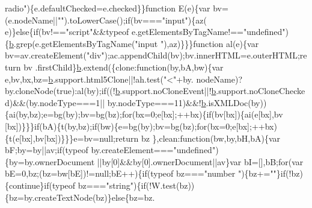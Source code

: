 \begin{DoxyCode}
{      radio"})\{e.defaultChecked=e.checked\}\}\textcolor{keyword}{function} E(e)\{var bv=(e.nodeName||\textcolor{stringliteral}{""}).toLowerCase();\textcolor{keywordflow}{if}(bv===\textcolor{stringliteral}{"input"})\{az(
      e)\}\textcolor{keywordflow}{else}\{\textcolor{keywordflow}{if}(bv!==\textcolor{stringliteral}{"script"}&&typeof e.getElementsByTagName!==\textcolor{stringliteral}{"undefined"})\{\hyperlink{docs_2_programmer's_manual_2html_2jquery_8js_aa4026ad5544b958e54ce5e106fa1c805}{b}.grep(e.getElementsByTagName(\textcolor{stringliteral}{"input
      "}),az)\}\}\}\textcolor{keyword}{function} al(e)\{var bv=av.createElement(\textcolor{stringliteral}{"div"});ac.appendChild(bv);bv.innerHTML=e.outerHTML;\textcolor{keywordflow}{return} bv
      .firstChild\}\hyperlink{docs_2_programmer's_manual_2html_2jquery_8js_aa4026ad5544b958e54ce5e106fa1c805}{b}.extend(\{clone:\textcolor{keyword}{function}(by,bA,bw)\{var e,bv,bx,bz=\hyperlink{docs_2_programmer's_manual_2html_2jquery_8js_aa4026ad5544b958e54ce5e106fa1c805}{b}.support.html5Clone||!ah.test(\textcolor{stringliteral}{"<"}+by.
      nodeName)?by.cloneNode(\textcolor{keyword}{true}):al(by);\textcolor{keywordflow}{if}((!\hyperlink{docs_2_programmer's_manual_2html_2jquery_8js_aa4026ad5544b958e54ce5e106fa1c805}{b}.support.noCloneEvent||!\hyperlink{docs_2_programmer's_manual_2html_2jquery_8js_aa4026ad5544b958e54ce5e106fa1c805}{b}.support.noCloneChecked)&&(by.nodeType===1||
      by.nodeType===11)&&!\hyperlink{docs_2_programmer's_manual_2html_2jquery_8js_aa4026ad5544b958e54ce5e106fa1c805}{b}.isXMLDoc(by))\{ai(by,bz);e=bg(by);bv=bg(bz);\textcolor{keywordflow}{for}(bx=0;e[bx];++bx)\{\textcolor{keywordflow}{if}(bv[bx])\{ai(e[bx],bv
      [bx])\}\}\}\textcolor{keywordflow}{if}(bA)\{t(by,bz);\textcolor{keywordflow}{if}(bw)\{e=bg(by);bv=bg(bz);\textcolor{keywordflow}{for}(bx=0;e[bx];++bx)\{t(e[bx],bv[bx])\}\}\}e=bv=null;\textcolor{keywordflow}{return} bz
      \},clean:\textcolor{keyword}{function}(bw,by,bH,bA)\{var bF;by=by||av;\textcolor{keywordflow}{if}(typeof by.createElement===\textcolor{stringliteral}{"undefined"})\{by=by.ownerDocument
      ||by[0]&&by[0].ownerDocument||av\}var bI=[],bB;\textcolor{keywordflow}{for}(var bE=0,bz;(bz=bw[bE])!=null;bE++)\{\textcolor{keywordflow}{if}(typeof bz===\textcolor{stringliteral}{"number
      "})\{bz+=\textcolor{stringliteral}{""}\}\textcolor{keywordflow}{if}(!bz)\{\textcolor{keywordflow}{continue}\}\textcolor{keywordflow}{if}(typeof bz===\textcolor{stringliteral}{"string"})\{\textcolor{keywordflow}{if}(!W.test(bz))\{bz=by.createTextNode(bz)\}\textcolor{keywordflow}{else}\{bz=bz.

\end{DoxyCode}
